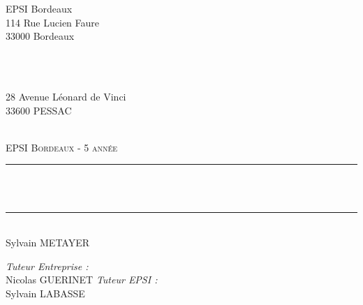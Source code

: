 \begin{titlepage}

\newcommand{\HRule}{\rule{\linewidth}{0.5mm}} %

\center %
 
\begin{minipage}{0.4\textwidth}
	\begin{flushleft} \large
		EPSI Bordeaux\\
		114 Rue Lucien Faure\\
		33000 Bordeaux
	\end{flushleft}
\end{minipage}
~
\begin{minipage}{0.4\textwidth}
	\begin{flushright} \large
		\onepoint\\
		28 Avenue Léonard de Vinci \\
		33600 PESSAC
	\end{flushright}
\end{minipage}\\[2cm]


\textsc{\LARGE EPSI Bordeaux - 5 année}\\[1.0cm]

\space

\HRule \\[0.4cm]
{ \huge \bfseries 
\problematique
}\\[0.4cm]
\HRule \\[1.5cm]

\LARGE Sylvain \textsc{METAYER}\\[2cm] %

\begin{flushleft} \large
	\emph{Tuteur Entreprise :}\\
	Nicolas \textsc{GUERINET}
	\newline\newline
	\emph{Tuteur EPSI :} \\
	Sylvain \textsc{LABASSE}
\end{flushleft}


\end{titlepage}
